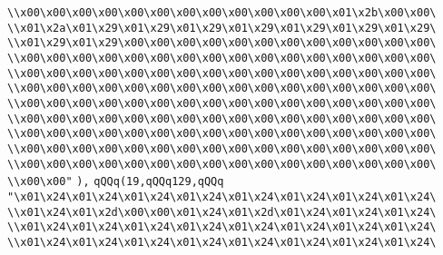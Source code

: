\verb|\\x00\x00\x00\x00\x00\x00\x00\x00\x00\x00\x00\x00\x01\x2b\x00\x00\|\newline
\verb|\\x01\x2a\x01\x29\x01\x29\x01\x29\x01\x29\x01\x29\x01\x29\x01\x29\|\newline
\verb|\\x01\x29\x01\x29\x00\x00\x00\x00\x00\x00\x00\x00\x00\x00\x00\x00\|\newline
\verb|\\x00\x00\x00\x00\x00\x00\x00\x00\x00\x00\x00\x00\x00\x00\x00\x00\|\newline
\verb|\\x00\x00\x00\x00\x00\x00\x00\x00\x00\x00\x00\x00\x00\x00\x00\x00\|\newline
\verb|\\x00\x00\x00\x00\x00\x00\x00\x00\x00\x00\x00\x00\x00\x00\x00\x00\|\newline
\verb|\\x00\x00\x00\x00\x00\x00\x00\x00\x00\x00\x00\x00\x00\x00\x00\x00\|\newline
\verb|\\x00\x00\x00\x00\x00\x00\x00\x00\x00\x00\x00\x00\x00\x00\x00\x00\|\newline
\verb|\\x00\x00\x00\x00\x00\x00\x00\x00\x00\x00\x00\x00\x00\x00\x00\x00\|\newline
\verb|\\x00\x00\x00\x00\x00\x00\x00\x00\x00\x00\x00\x00\x00\x00\x00\x00\|\newline
\verb|\\x00\x00\x00\x00\x00\x00\x00\x00\x00\x00\x00\x00\x00\x00\x00\x00\|\newline
\verb|\\x00\x00"|\newline
\verb|),|\newline
\verb|qQQq(19,qQQq129,qQQq|\newline
\verb|"\x01\x24\x01\x24\x01\x24\x01\x24\x01\x24\x01\x24\x01\x24\x01\x24\|\newline
\verb|\\x01\x24\x01\x2d\x00\x00\x01\x24\x01\x2d\x01\x24\x01\x24\x01\x24\|\newline
\verb|\\x01\x24\x01\x24\x01\x24\x01\x24\x01\x24\x01\x24\x01\x24\x01\x24\|\newline
\verb|\\x01\x24\x01\x24\x01\x24\x01\x24\x01\x24\x01\x24\x01\x24\x01\x24\|\newline

